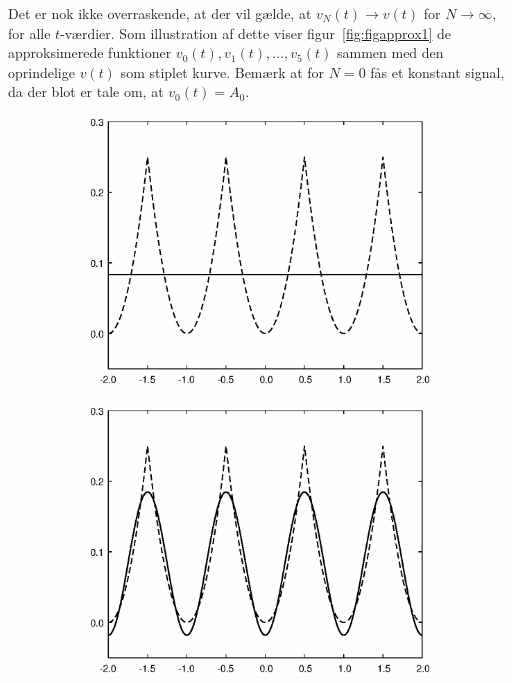 \documentclass[11pt,a4paper]{article}
\begin{document}
Det er nok ikke overraskende, at der vil gælde, at $v_{N}(t)\rightarrow{}v(t)$ for $N\rightarrow\infty$, for alle $t$-værdier. Som illustration af dette viser figur~\ref{fig:figapprox1} de approksimerede funktioner $v_0(t),v_1(t),\ldots{},v_5(t)$ sammen med den oprindelige $v(t)$ som stiplet kurve. Bemærk at for $N=0$ fås et konstant signal, da der blot er tale om, at $v_0(t)=A_0$.
\begin{figure}[htbp]
\centering
\begin{subfigure}{0.48\textwidth}
\includegraphics[scale=0.5]{approx1_000}
\end{subfigure}
\begin{subfigure}{0.48\textwidth}
\includegraphics[scale=0.5]{approx1_001}

\end{subfigure}
\end{figure}
\end{document}
